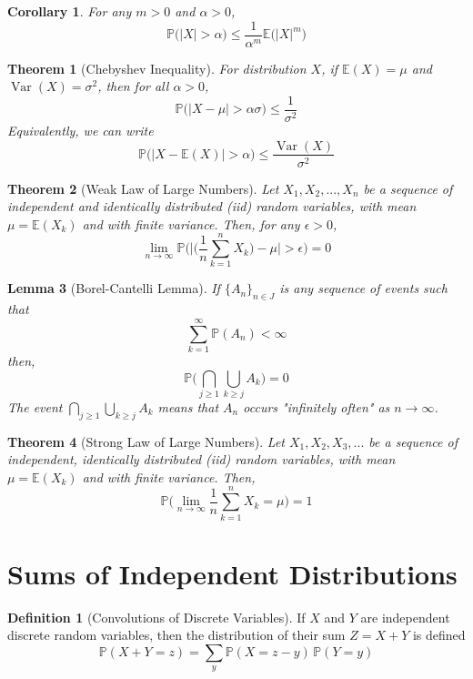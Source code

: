 \documentclass{article}
\DeclareMathOperator{\Var}{Var}
\newtheorem{theorem}{Theorem}[section]
\newtheorem{lemma}[theorem]{Lemma}
\newtheorem{corollary}{Corollary}[theorem]
\theoremstyle{remark}
\theoremstyle{definition}
\newtheorem{definition}{Definition}[section]
\begin{document}
\begin{corollary}
For any $m > 0$ and $\alpha > 0$,  
\[\mathbb{P} \big(|X| > \alpha \big) \leq \frac{1}{\alpha^m} \mathbb{E} \big( |X|^m \big)\]
\end{corollary}

\begin{theorem}[Chebyshev Inequality]
For distribution $X$, if $\mathbb{E}(X) = \mu$ and $\Var(X) = \sigma^2$, then for all $\alpha > 0$, 
\[\mathbb{P} \big( |X - \mu| > \alpha \sigma \big) \leq \frac{1}{\sigma^2}\]
Equivalently, we can write 
\[\mathbb{P} \big( |X - \mathbb{E}(X)| > \alpha \big) \leq \frac{\Var(X)}{\sigma^2}\]
\end{theorem}

\begin{theorem}[Weak Law of Large Numbers]
Let $X_1, X_2, ..., X_n$ be a sequence of independent and identically distributed (iid) random variables, with mean $\mu= \mathbb{E}(X_k)$ and with finite variance. Then, for any $\epsilon > 0$, 
\[\lim_{n \rightarrow \infty} \mathbb{P} \bigg( \bigg| \Big( \frac{1}{n} \sum_{k=1}^n X_k \big) - \mu \bigg| > \epsilon \bigg) = 0\]
\end{theorem}

\begin{lemma}[Borel-Cantelli Lemma]
If $\{A_n\}_{n \in J}$ is any sequence of events such that 
\[\sum_{k=1}^\infty \mathbb{P}(A_n) < \infty\]
then, 
\[\mathbb{P} \bigg( \bigcap_{j \geq 1} \bigcup_{k \geq j} A_k \bigg) = 0\]
The event $\bigcap_{j \geq 1} \bigcup_{k \geq j} A_k$ means that $A_n$ occurs "infinitely often" as $n \rightarrow \infty$. 
\end{lemma}

\begin{theorem}[Strong Law of Large Numbers]
Let $X_1, X_2, X_3, ...$ be a sequence of independent, identically distributed (iid) random variables, with mean $\mu = \mathbb{E}(X_k)$ and with finite variance. Then, 
\[\mathbb{P} \bigg( \lim_{n \rightarrow \infty} \frac{1}{n} \sum_{k=1}^n X_k = \mu \bigg) = 1\]
\end{theorem}

\section{Sums of Independent Distributions}
\begin{definition}[Convolutions of Discrete Variables]
If $X$ and $Y$ are independent discrete random variables, then the distribution of their sum $Z = X + Y$ is defined
\[\mathbb{P}(X + Y = z) = \sum_{y} \mathbb{P}(X = z-y) \, \mathbb{P}(Y=y)\]
\end{definition}
\end{document}
